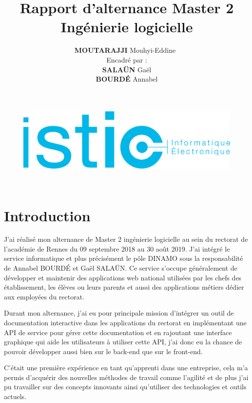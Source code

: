 \documentclass[12pt]{article}
\title{\textbf{Rapport d'alternance Master 2 Ingénierie logicielle\\ }}
\author{\textbf{MOUTARAJJI} Mouhyi-Eddine\
\\Encadré par :\\\textbf{SALAÜN} Gaël \\\textbf{BOURDÉ} Annabel }
\begin{document}
\date{}

\begin{figure}
\centering
\includegraphics[width=1.1\textwidth]{diagrammes/logoisticfr_0.png}
\end{figure}


\maketitle

\newpage

\tableofcontents
~
\newpage

\section{Introduction}

J'ai réalisé mon alternance de Master 2 ingénierie logicielle au sein du rectorat de l'académie de Rennes du 09 septembre 2018 au 30 août 2019. J'ai intégré le service informatique et plus précisément le pôle DINAMO sous la responsabilité  de Annabel BOURDÉ et Gaël SALAÜN. Ce service s'occupe généralement de développer et maintenir des applications web national utilisées par les chefs des établissement, les élèves  ou leurs parents et aussi des applications métiers dédier aux employées du rectorat.\newline


Durant mon alternance, j'ai eu pour principale mission d'intégrer un outil de documentation interactive dans les applications du rectorat en implémentant une API de service pour gérer cette documentation et en rajoutant une interface graphique qui aide les utilisateurs à utiliser cette API, j'ai donc eu la chance de pouvoir développer aussi bien sur le back-end que sur le front-end.\newline


C'était une première expérience en tant qu'apprenti dans une entreprise, cela m'a permis d'acquérir des nouvelles méthodes de travail comme l'agilité et de plus j'ai pu travailler sur des concepts innovants ainsi qu'utiliser des technologies et outils actuels.\newline
\end{document}
